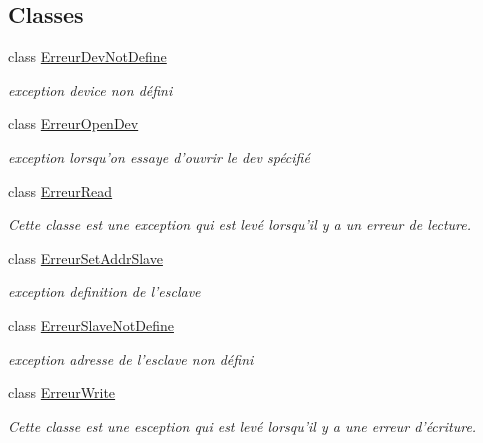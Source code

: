 \subsection*{Classes}
\begin{DoxyCompactItemize}
\item 
class \hyperlink{classCI2C_1_1ErreurDevNotDefine}{Erreur\+Dev\+Not\+Define}
\begin{DoxyCompactList}\small\item\em exception device non défini \end{DoxyCompactList}\item 
class \hyperlink{classCI2C_1_1ErreurOpenDev}{Erreur\+Open\+Dev}
\begin{DoxyCompactList}\small\item\em exception lorsqu'on essaye d'ouvrir le dev spécifié \end{DoxyCompactList}\item 
class \hyperlink{classCI2C_1_1ErreurRead}{Erreur\+Read}
\begin{DoxyCompactList}\small\item\em Cette classe est une exception qui est levé lorsqu'il y a un erreur de lecture. \end{DoxyCompactList}\item 
class \hyperlink{classCI2C_1_1ErreurSetAddrSlave}{Erreur\+Set\+Addr\+Slave}
\begin{DoxyCompactList}\small\item\em exception definition de l'esclave \end{DoxyCompactList}\item 
class \hyperlink{classCI2C_1_1ErreurSlaveNotDefine}{Erreur\+Slave\+Not\+Define}
\begin{DoxyCompactList}\small\item\em exception adresse de l'esclave non défini \end{DoxyCompactList}\item 
class \hyperlink{classCI2C_1_1ErreurWrite}{Erreur\+Write}
\begin{DoxyCompactList}\small\item\em Cette classe est une esception qui est levé lorsqu'il y a une erreur d'écriture. \end{DoxyCompactList}\end{DoxyCompactItemize}
